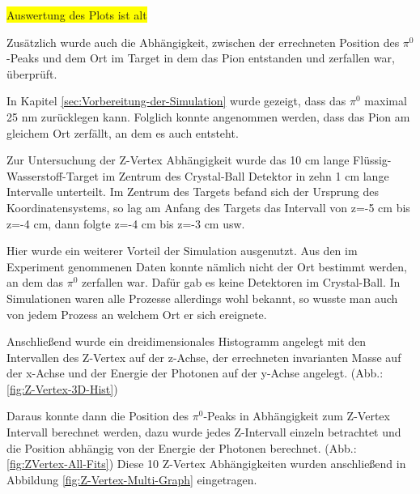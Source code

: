 \documentclass[a4paper,11pt,oneside,final,german,openbib,pdftex]{scrbook}
\begin{document}
{\colorbox{yellow}{Auswertung des Plots ist alt}

Zusätzlich wurde auch die Abh\"angigkeit, zwischen der errechneten  Position des $\pi^0$-Peaks und dem Ort im Target in dem das Pion entstanden und zerfallen war, \"uberpr\"uft. 

In Kapitel \ref{sec:Vorbereitung-der-Simulation} wurde gezeigt, dass das $\pi^0$ maximal 25 nm zurücklegen kann. Folglich konnte angenommen werden, dass das Pion am gleichem Ort zerf\"allt, an dem es auch entsteht.

 
Zur Untersuchung der Z-Vertex Abhängigkeit wurde das 10 cm lange Fl\"ussig-Wasserstoff-Target im Zentrum des Crystal-Ball Detektor in zehn 1 cm lange Intervalle unterteilt. 
Im Zentrum des Targets befand sich der Ursprung des Koordinatensystems, so lag am Anfang des Targets das Intervall von z=-5 cm bis z=-4 cm, dann folgte z=-4 cm bis z=-3 cm usw. 

Hier wurde ein weiterer Vorteil der Simulation ausgenutzt. Aus den im Experiment genommenen Daten konnte n\"amlich nicht der Ort bestimmt werden, an dem das $\pi^0$ zerfallen war. Daf\"ur gab es keine Detektoren im Crystal-Ball. In Simulationen waren alle Prozesse allerdings wohl bekannt, so wusste man auch von jedem Prozess an welchem Ort er sich ereignete. 

Anschließend wurde ein dreidimensionales Histogramm angelegt mit den Intervallen des Z-Vertex auf der z-Achse, der errechneten invarianten Masse auf der x-Achse und der Energie der Photonen auf der y-Achse angelegt. (Abb.: \ref{fig:Z-Vertex-3D-Hist})

Daraus konnte dann die Position des $\pi^0$-Peaks in Abhängigkeit zum Z-Vertex Intervall berechnet werden, dazu wurde jedes Z-Intervall einzeln betrachtet und die Position abhängig von der Energie der Photonen berechnet. (Abb.: \ref{fig:ZVertex-All-Fits})
Diese 10 Z-Vertex Abhängigkeiten wurden anschließend in Abbildung \ref{fig:Z-Vertex-Multi-Graph} eingetragen.

}
\end{document}
